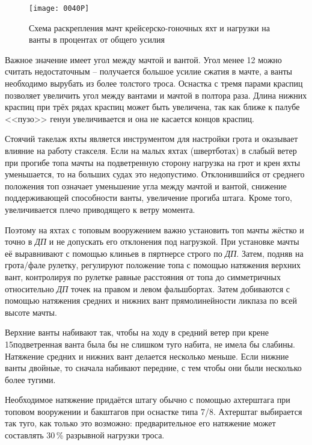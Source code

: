 \begin{figure}[htb]
  \centering{}
  \texttt{[image: 0040P]}
  \caption{Схема раскрепления мачт крейсерско-гоночных яхт и нагрузки на ванты в процентах от общего усилия}
  \label{fig:40}
\end{figure}

Важное значение имеет угол между мачтой и вантой. Угол менее 12\gr
можно считать недостаточным \--- получается большое усилие сжатия в
мачте, а ванты необходимо вырубать из более толстого троса. Оснастка с
тремя парами краспиц позволяет увеличить угол между вантами и мачтой в
полтора раза. Длина нижних краспиц при трёх рядах краспиц может быть
увеличена, так как ближе к палубе <<пузо>> генуи увеличивается и она
не касается концов краспиц.

Стоячий такелаж яхты является инструментом для настройки грота и
оказывает влияние на работу стакселя. Если на малых яхтах (швертботах)
в слабый ветер при прогибе топа мачты на подветренную сторону нагрузка
на грот и крен яхты уменьшается, то на больших судах это
недопустимо. Отклонившийся от среднего положения топ означает
уменьшение угла между мачтой и вантой, снижение поддерживающей
способности ванты, увеличение прогиба штага. Кроме того, увеличивается
плечо приводящего к ветру момента.

Поэтому на яхтах с топовым вооружением важно установить топ мачты
жёстко и точно в \textit{ДП} и не допускать его отклонения под
нагрузкой. При установке мачты её выравнивают с помощью клиньев в
пяртнерсе строго по \textit{ДП}. Затем, подняв на грота\-/фале
рулетку, регулируют положение топа с помощью натяжения верхних вант,
контролируя по рулетке равные расстояния от топа до симметричных
относительно \textit{ДП} точек на правом и левом фальшбортах. Затем
добиваются с помощью натяжения средних и нижних вант прямолинейности
ликпаза по всей высоте мачты.

Верхние ванты набивают так, чтобы на ходу в средний ветер при крене
15\gr подветренная ванта была бы не слишком туго набита, не
имела бы слабины. Натяжение средних и нижних вант делается несколько
меньше. Если нижние ванты двойные, то сначала набивают передние, с тем
чтобы они были несколько более тугими.

Необходимое натяжение придаётся штагу обычно с помощью ахтерштага при
топовом вооружении и бакштагов при оснастке типа 7/8. Ахтерштаг
выбирается так туго, как только это возможно: предварительное его
натяжение может составлять 30\,\% разрывной нагрузки троса.

